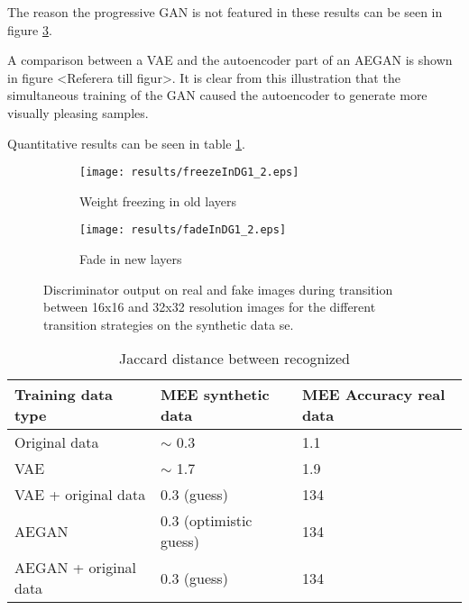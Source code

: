 The reason the progressive GAN is not featured in these results can be seen in figure \ref{fig:fadeVsFreeze}.

A comparison between a VAE and the autoencoder part of an AEGAN is shown in figure <Referera till figur>. It is clear from this illustration that the simultaneous training of the GAN caused the autoencoder to generate more visually pleasing samples.

Quantitative results can be seen in table \ref{tab:quantitative_results}.

\begin{figure}[t]
    \centering
    \begin{subfigure}[b]{0.49\textwidth}
        \texttt{[image: results/freezeInDG1\_2.eps]}
        \caption{Weight freezing in old layers}
        \label{fig:freezeInDG1}
    \end{subfigure}
    \begin{subfigure}[b]{0.49\textwidth}
        \texttt{[image: results/fadeInDG1\_2.eps]}
        \caption{Fade in new layers}
        \label{fig:freezeInDG2}
    \end{subfigure}
    \caption{Discriminator output on real and fake images during transition between 16x16 and 32x32 resolution images for the different transition strategies on the synthetic data se.}
    \label{fig:fadeVsFreeze}
\end{figure}

\begin{table}[t]
    \centering
    \caption{Jaccard distance between recognized }
    \label{tab:quantitative_results}
    \begin{tabular}{l|l|l}
    \hline
    Training data type      & MEE synthetic data  & MEE Accuracy real data \\ \hline
    Original data           & $\sim$ 0.3 & 1.1     \\
    VAE                     & $\sim$ 1.7 & 1.9     \\
    VAE + original data     & 0.3 (guess) & 134     \\
    AEGAN                   & 0.3 (optimistic guess) & 134     \\
    AEGAN + original data   & 0.3 (guess) & 134     \\
    \end{tabular}
\end{table}

